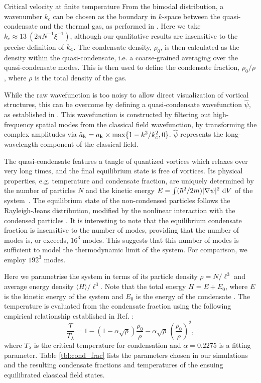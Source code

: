\begin{chapter}{\label{cha:nonequib}Critical velocity at finite temperature}
From the bimodal distribution, a wavenumber $k_c$ can be chosen as the boundary in $k$-space between the quasi-condensate and the thermal gas, as performed in \cite{PhysRevA.66.013603}.  Here we take $k_c \approx 13~(2\pi N^{-1} \xi^{-1})$, although our qualitative results are insensitive to the precise definition of $k_{\rm c}$.  The condensate density, $\rho_0$, is then calculated as the density within the quasi-condensate, i.e. a coarse-grained averaging over the quasi-condensate modes.  This is then used to define the condensate fraction, $\rho_0/\rho$, where $\rho$ is the total density of the gas.

While the raw wavefunction is too noisy to allow direct visualization of vortical structures, this can be overcome by defining a quasi-condensate wavefunction $\hat{\psi}$, as established in \cite{PhysRevA.66.013603}.   This wavefunction is constructed by filtering out high-frequency spatial modes from the classical field wavefunction, by 
transforming the complex amplitudes via
$\hat{a}_{{\bf k}} = a_{{\bf k}}\times\max\{1-k^{2}/k_c^2,0\}$. $\hat{\psi}$ represents the long-wavelength component of the classical field.

The quasi-condensate features a tangle of quantized vortices which relaxes over very long times, and the final equilibrium state is free of vortices.  Its physical properties, e.g. temperature and condensate fraction, are uniquely determined by the number of particles $N$ and the kinetic energy $E=\int (\hbar^2/2m)|\nabla \psi|^2~{\rm d}V$ of the system~\cite{PhysRevLett.95.263901}.  The equilibrium state of the non-condensed particles follows the Rayleigh-Jeans distribution, modified by the nonlinear interaction with the condensed particles \cite{PhysRevLett.95.263901}.  It is interesting to note that the equilibrium condensate fraction is insensitive to the number of modes, providing that the number of modes is, or exceeds, $16^3$ modes.  This suggests that this number of modes is sufficient to model the thermodynamic limit of the system. For comparison, we employ $192^3$ modes.

Here we parametrise the system in terms of its particle density $\rho = N/\ell^3$ and average energy density $\langle H \rangle/\ell^3$.  Note that the total energy $H=E+E_0$, where $E$ is the kinetic energy of the system and $E_0$ is the energy of the condensate \cite{PhysRevLett.95.263901}. 
The temperature is evaluated from the condensate fraction using the following
empirical relationship established in Ref. \cite{berloff_2007}:
\begin{equation}
  \frac{T}{T_\lambda} = 1 - (1 - \alpha\sqrt{\rho})\frac{\rho_0}{\rho} - \alpha\sqrt{\rho}\,\left(\frac{\rho_0}{\rho}\right)^2,
  \label{eq:temp}
\end{equation}
where $T_{\lambda}$ is the critical temperature for condensation
and $\alpha=0.2275$ is a fitting parameter.
Table \ref{tbl:cond_frac} lists the parameters chosen in our simulations
and the resulting condensate fractions and temperatures
of the ensuing equilibrated classical field states.


\end{chapter}
